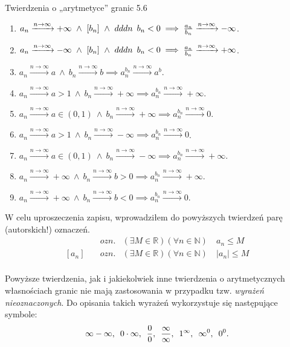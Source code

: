 \documentclass{article}
\newcommand{\hquad}{\mkern9mu}
\newcommand{\R}{\mathbb{R}}
\newcommand{\N}{\mathbb{N}}
\newcommand{\arn}{\xrightarrow{n\to\infty}}
\begin{document}
\begin{twier}{Twierdzenia o „arytmetyce” granic 5.6}
\begin{enumerate}[label=(\arabic*)]
        \item $a_n\arn+\infty\ \land\ [b_n]\ \land\ dddn\hquad b_n<0\implies \frac{a_n}{b_n}\arn-\infty$.
        \item $a_n\arn-\infty\ \land\ [b_n]\ \land\ dddn\hquad b_n<0\implies \frac{a_n}{b_n}\arn+\infty$.
        \item $a_n\arn a\ \land\ b_n\arn b\implies a_n^{b_n}\arn a^b$.
        \item $a_n\arn a>1\ \land\ b_n\arn +\infty\implies a_n^{b_n}\arn +\infty$.
        \item $a_n\arn a\in(0,1)\ \land\ b_n\arn +\infty\implies a_n^{b_n}\arn 0$.
        \item $a_n\arn a>1\ \land\ b_n\arn -\infty\implies a_n^{b_n}\arn 0$.
        \item $a_n\arn a\in(0,1)\ \land\ b_n\arn -\infty\implies a_n^{b_n}\arn +\infty$.
        \item $a_n\arn +\infty\ \land\ b_n\arn b>0\implies a_n^{b_n}\arn +\infty$.
        \item $a_n\arn +\infty\ \land\ b_n\arn b<0\implies a_n^{b_n}\arn 0$.
    \end{enumerate}
\end{twier}

W celu uproszeczenia zapisu, wprowadziłem do powyższych twierdzeń parę (autorskich!) oznaczeń.
\begin{align*}
    [a_n\quad &ozn. &(\exists m\in\R)(\forall n\in\N)\ &a_n\ge m\\
    a_n]\quad &ozn. &(\exists M\in\R)(\forall n\in\N)\ &a_n\le M\\
    [a_n]\quad &ozn. &(\exists M\in\R)(\forall n\in\N)\ &|a_n|\le M\\
\end{align*}

Powyższe twierdzenia, jak i jakiekolwiek inne twierdzenia o arytmetycznych własnościach
granic nie mają zastosowania w przypadku tzw. \textit{wyrażeń nieoznaczonych}.
Do opisania takich wyrażeń wykorzystuje się następujące symbole:
\begin{equation*}
\infty -\infty  ,\hquad 0\cdot\infty,\hquad \frac{0}{0},\hquad \frac{\infty}{\infty},
\hquad 1^{\infty},\hquad \infty^{0},\hquad 0^0.  
\end{equation*}
\end{document}
